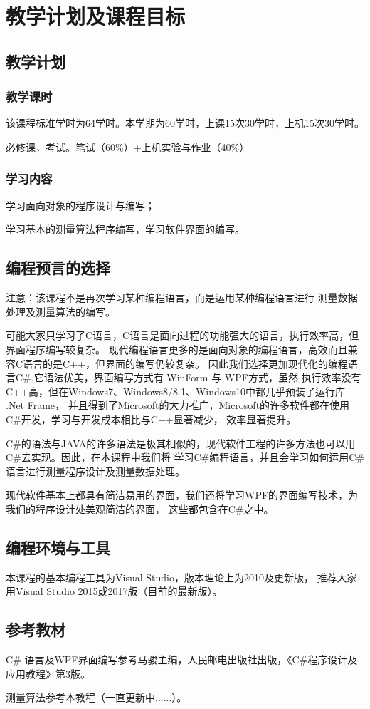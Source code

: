 ﻿%


\chapter{教学计划及课程目标}

\section*{教学计划}

\subsection*{教学课时}
该课程标准学时为64学时。本学期为60学时，上课15次30学时，上机15次30学时。

必修课，考试。笔试（60\%）+上机实验与作业（40\%）

\subsection*{学习内容}

学习面向对象的程序设计与编写；

学习基本的测量算法程序编写，学习软件界面的编写。

\section*{编程预言的选择}

注意：该课程不是再次学习某种编程语言，而是运用某种编程语言进行
测量数据处理及测量算法的编写。

可能大家只学习了C语言，C语言是面向过程的功能强大的语言，执行效率高，但界面程序编写较复杂。
现代编程语言更多的是面向对象的编程语言，高效而且兼容C语言的是C++，但界面的编写仍较复杂。
因此我们选择更加现代化的编程语言C\#,它语法优美，界面编写方式有 WinForm 与 WPF方式，虽然
执行效率没有C++高，但在Windows7、Windows8/8.1、Windows10中都几乎预装了运行库 .Net Frame，
并且得到了Microsoft的大力推广，Microsoft的许多软件都在使用C\#开发，学习与开发成本相比与C++显著减少，
效率显著提升。

C\#的语法与JAVA的许多语法是极其相似的，现代软件工程的许多方法也可以用C\#去实现。因此，在本课程中我们将
学习C\#编程语言，并且会学习如何运用C\#语言进行测量程序设计及测量数据处理。

现代软件基本上都具有简洁易用的界面，我们还将学习WPF的界面编写技术，为我们的程序设计处美观简洁的界面，
这些都包含在C\#之中。

\section*{编程环境与工具}

本课程的基本编程工具为Visual Studio，版本理论上为2010及更新版，
推荐大家用Visual Studio 2015或2017版（目前的最新版）。

\section*{参考教材}

C\# 语言及WPF界面编写参考马骏主编，人民邮电出版社出版，《C\#程序设计及应用教程》第3版。

测量算法参考本教程（一直更新中......）。